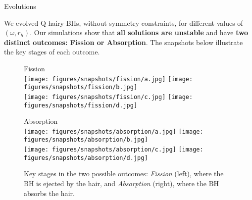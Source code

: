 \begin{block}{Evolutions}

We evolved Q-hairy \glspl{BH}, without symmetry constraints, for different values of $(\omega, r_h)$. Our simulations show that \textbf{all solutions are unstable} and have \textbf{two distinct outcomes: Fission or Absorption}. The snapshots below illustrate the key stages of each outcome.

\begin{figure}[H]
    \centering
    \begin{minipage}[t]{0.49\textwidth}
        \centering
        {\large \Raleway \phantom{p} \textmd{Fission} \phantom{p}} \\  %
        \vspace{0.75em}
        \texttt{[image: figures/snapshots/fission/a.jpg]}
        \texttt{[image: figures/snapshots/fission/b.jpg]}\\[0.4ex]
        \texttt{[image: figures/snapshots/fission/c.jpg]}
        \texttt{[image: figures/snapshots/fission/d.jpg]}
    \end{minipage}
    \hfill
    \begin{minipage}[t]{0.49\textwidth}
        \centering
        {\large \Raleway \textmd{Absorption}} \\
        \vspace{0.75em}
        \texttt{[image: figures/snapshots/absorption/a.jpg]}
        \texttt{[image: figures/snapshots/absorption/b.jpg]}\\[0.4ex]
        \texttt{[image: figures/snapshots/absorption/c.jpg]}
        \texttt{[image: figures/snapshots/absorption/d.jpg]}
    \end{minipage}
    \caption{Key stages in the two possible outcomes: \textit{Fission} (left), where the \gls{BH} is ejected by the hair, and \textit{Absorption} (right), where the \gls{BH} absorbs the hair.}
\end{figure}

\end{block}
